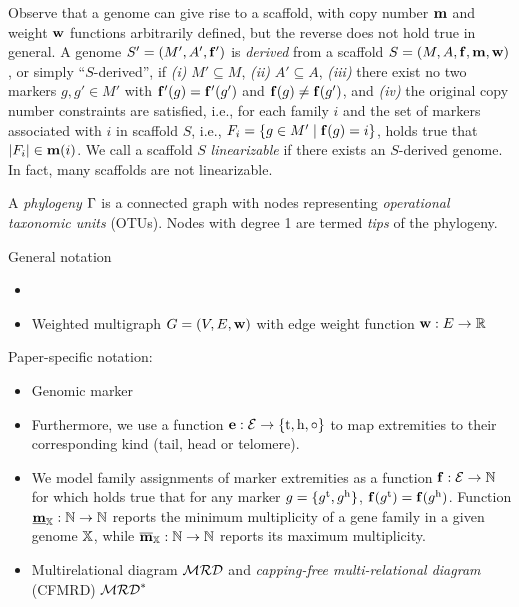 \documentclass[runningheads]{llncs}
\begin{document}
Observe that a genome can give rise to a scaffold, with copy number $\mathbf{m}$ and weight $\mathbf{w}$ functions arbitrarily defined, but the reverse does not hold true in general.
A genome $S' = (M', A', \mathbf{f}')$ is \emph{derived} from a scaffold $S = (M, A, \mathbf{f}, \mathbf{m}, \mathbf{w})$, or simply ``$S$-derived'', if \emph{(i)} $M' \subseteq M$, \emph{(ii)} $A' \subseteq A$, \emph{(iii)} 
there exist no two markers $g, g' \in M'$ with $\mathbf{f}'(g) = \mathbf{f}'(g')$ and $\mathbf{f}(g) \neq \mathbf{f}(g')$, and \emph{(iv)} the original copy number constraints are satisfied, i.e., for each family $i$ and the set of markers associated with $i$ in scaffold $S$, i.e., $F_i = \{ g \in M' \mid \mathbf{f}(g) = i\}$, holds true that $|F_i| \in \mathbf{m}(i)$.
We call a scaffold $S$ \emph{linearizable} if there exists an $S$-derived genome. 
In fact, many scaffolds are not linearizable. 

A \emph{phylogeny} $\Gamma$ is a connected graph with nodes representing \emph{operational taxonomic units} (OTUs). 
Nodes with degree 1 are termed \emph{tips} of the phylogeny.

General notation
\begin{itemize}
    \item 
    \item Weighted multigraph $G = (V, E, \mathbf{w})$ with edge weight function $\mathbf{w}: E \to \mathbb R$
\end{itemize}

Paper-specific notation:

\begin{itemize}
    \item Genomic marker 
    \item Furthermore, we use a function $\mathbf{e} : \mathcal{E} \to \{\textnormal{t}, \textnormal{h}, \circ\}$ to map extremities to their corresponding kind (tail, head or telomere). 
    \item 
We model family assignments of marker extremities as a function $\mathbf{f}: \mathcal{E} \to \mathbb N$ for which holds true that for any marker $g = \{g^{\textnormal{t}}, g^{\textnormal{h}}\}$, $\mathbf{f}(g^{\textnormal{t}}) = \mathbf{f}(g^{\textnormal{h}})$.  
Function 
$\underline{\mathbf{m}}_{\mathbb{X}} : \mathbb N \to \mathbb N$ reports the minimum multiplicity of a gene family in a given genome $\mathbb{X}$, while $\overline{\mathbf{m}}_{\mathbb{X}}: \mathbb N \to \mathbb N$ reports its maximum multiplicity. 
    \item Multirelational diagram $\mathcal{MRD}$ and \emph{capping-free multi-relational diagram} (CFMRD) $\mathcal{MRD}^*$
\end{itemize}
\end{document}
